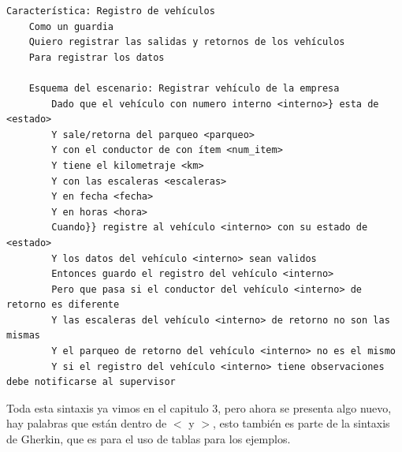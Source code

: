 {\scriptsize
\begin{verbatim}
Característica: Registro de vehículos
    Como un guardia
    Quiero registrar las salidas y retornos de los vehículos
    Para registrar los datos

    Esquema del escenario: Registrar vehículo de la empresa
        Dado que el vehículo con numero interno <interno>} esta de <estado>
        Y sale/retorna del parqueo <parqueo>
        Y con el conductor de con ítem <num_item>
        Y tiene el kilometraje <km>
        Y con las escaleras <escaleras>
        Y en fecha <fecha>
        Y en horas <hora>
        Cuando}} registre al vehículo <interno> con su estado de <estado>
        Y los datos del vehículo <interno> sean validos
        Entonces guardo el registro del vehículo <interno>
        Pero que pasa si el conductor del vehículo <interno> de retorno es diferente
        Y las escaleras del vehículo <interno> de retorno no son las mismas
        Y el parqueo de retorno del vehículo <interno> no es el mismo
        Y si el registro del vehículo <interno> tiene observaciones debe notificarse al supervisor
\end{verbatim}
}

Toda esta sintaxis ya vimos en el capitulo 3, pero ahora se presenta algo nuevo,
hay palabras que están dentro de {\bfseries $<$} y {\bfseries $>$}, esto también es
parte de la sintaxis de Gherkin, que es para el uso de tablas para los ejemplos.

